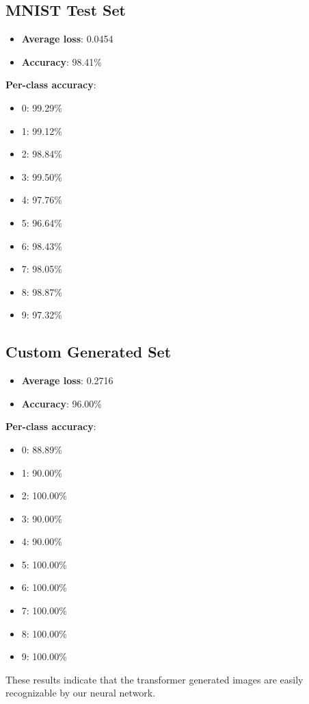 \documentclass[lettersize,journal]{IEEEtran}
\begin{document}
\subsection{MNIST Test Set}
\begin{itemize}
    \item \textbf{Average loss}: 0.0454
    \item \textbf{Accuracy}: 98.41\%
\end{itemize}
\textbf{Per-class accuracy}:
\begin{itemize}
    \item 0: 99.29\%
    \item 1: 99.12\%
    \item 2: 98.84\%
    \item 3: 99.50\%
    \item 4: 97.76\%
    \item 5: 96.64\%
    \item 6: 98.43\%
    \item 7: 98.05\%
    \item 8: 98.87\%
    \item 9: 97.32\%
\end{itemize}
\subsection{Custom Generated Set}
\begin{itemize}
    \item \textbf{Average loss}: 0.2716
    \item \textbf{Accuracy}: 96.00\%
\end{itemize}
\textbf{Per-class accuracy}:
\begin{itemize}
    \item 0: 88.89\%
    \item 1: 90.00\%
    \item 2: 100.00\%
    \item 3: 90.00\%
    \item 4: 90.00\%
    \item 5: 100.00\%
    \item 6: 100.00\%
    \item 7: 100.00\%
    \item 8: 100.00\%
    \item 9: 100.00\%
\end{itemize}
These results indicate that the transformer generated images are easily recognizable by our 
neural network. 

\vfill
\end{document}
